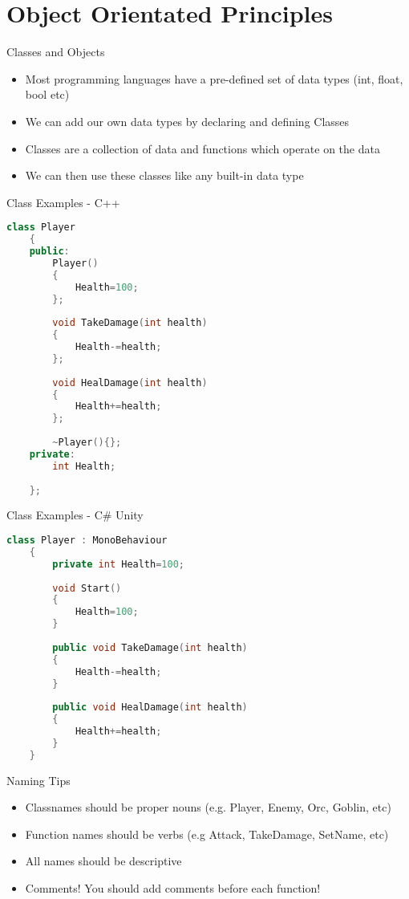 \part{Object Orientated Principles}
\frame{\partpage}

\begin{frame}{Classes and Objects}
	\begin{itemize}
		\pause \item Most programming languages have a pre-defined set of data types (int, float, bool etc)
		\pause \item We can add our own data types by declaring and defining Classes
		\pause \item Classes are a collection of data and functions which operate on the data
		\pause \item We can then use these classes like any built-in data type
	\end{itemize}
\end{frame}

\begin{frame}[fragile]{Class Examples - C++}
	\begin{lstlisting}[language=C++]
	class Player
	{
	public:
		Player()
		{
			Health=100;
		};
		
		void TakeDamage(int health)
		{
			Health-=health;
		};
		
		void HealDamage(int health)
		{
			Health+=health;
		};
		
		~Player(){};
	private:
		int Health;
		
	};
	\end{lstlisting}
\end{frame}

\begin{frame}[fragile]{Class Examples - C\# Unity}
	\begin{lstlisting}[language=C++]
	class Player : MonoBehaviour
	{
		private int Health=100;
		
		void Start()
		{
			Health=100;
		}
	
		public void TakeDamage(int health)
		{
			Health-=health;
		}
	
		public void HealDamage(int health)
		{
			Health+=health;
		}
	}
	\end{lstlisting}
\end{frame}

\begin{frame}{Naming Tips}
	\begin{itemize}
		\pause \item Classnames should be proper nouns (e.g. Player, Enemy, Orc, Goblin, etc)
		\pause \item Function names should be verbs (e.g Attack, TakeDamage, SetName, etc)
		\pause \item All names should be descriptive
		\pause \item Comments! You should add comments before each function!
	\end{itemize}
\end{frame}

